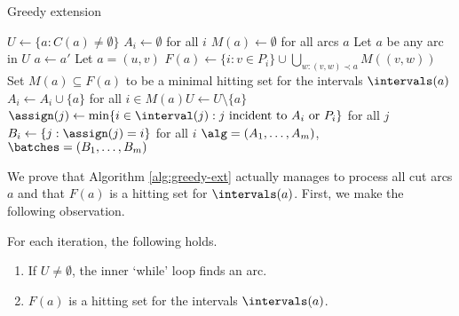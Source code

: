 \begin{algorithm}
\caption{Greedy extension}
  \begin{algorithmic}[1]
   \label{alg:greedy-ext}
    \STATE $U \gets \{a : C(a) \neq \emptyset\}$ 
    \STATE $A_i \gets \emptyset$ for all $i$
    \STATE $M(a) \gets \emptyset$ for all arcs $a$
\STATE Let $a$ be any arc in $U$
    \STATE $a \gets a'$
    \ENDWHILE
    \STATE Let $a = (u,v)$
\STATE $F(a) \gets \{i : v \in P_i\} \cup
    \bigcup_{w: (v,w) \prec a} M((v,w))$
    \STATE Set $M(a) \subseteq F(a)$ to be a minimal hitting set
    for the intervals $\intervals(a)$
    \STATE $A_i \gets A_i \cup \{a\}$ for all $i \in M(a)$\STATE $U \gets U \setminus \{a\}$
    \ENDWHILE
\STATE $\assign(j) \gets \min\{i \in \interval(j) : \text{$j$
      incident to $A_i$ or $P_i$}\}$ for all $j$
    \STATE $B_i \gets \{j : \assign(j) = i\}$ for all $i$
    \RETURN $\alg = (A_1, \ldots, A_m)$, $\batches = (B_1, \ldots, B_m)$
  \end{algorithmic}
\end{algorithm}

We prove that Algorithm \ref{alg:greedy-ext} actually manages to
process all cut arcs $a$ and that $F(a)$ is a hitting set for
$\intervals(a)$. First, we make the following observation.

\begin{lemma}
  \label{lem:invariants}
  For each iteration, the following holds.
  \begin{enumerate}
  \item If $U \neq \emptyset$, the inner `while' loop finds an arc.
  \item $F(a)$ is
    a hitting set for the intervals $\intervals(a)$.
  \end{enumerate}
\end{lemma}

